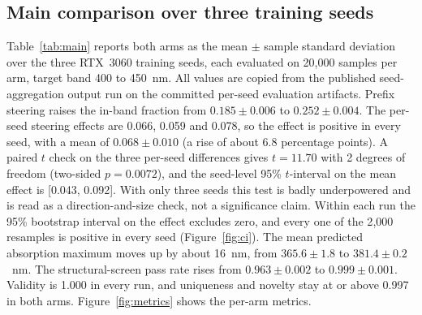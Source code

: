 \documentclass[11pt]{article}
\begin{document}
\subsection{Main comparison over three training seeds}
\label{sec:seeds}

Table~\ref{tab:main} reports both arms as the mean $\pm$ sample standard deviation over
the three RTX~3060 training seeds, each evaluated on 20{,}000 samples per arm, target band
400 to 450~nm. All values are copied from the published seed-aggregation
output run on the committed per-seed evaluation artifacts. Prefix steering raises the in-band fraction from
$0.185 \pm 0.006$ to $0.252 \pm 0.004$. The per-seed steering effects are 0.066, 0.059 and
0.078, so the effect is positive in every seed, with a mean of $0.068 \pm 0.010$ (a rise of
about 6.8 percentage points). A paired $t$ check on the three per-seed differences gives
$t = 11.70$ with 2 degrees of freedom (two-sided $p = 0.0072$), and the seed-level 95\%
$t$-interval on the mean effect is [0.043, 0.092]. With only three seeds this test is badly
underpowered and is read as a direction-and-size check, not a significance claim. Within
each run the 95\% bootstrap interval on the effect excludes zero, and every one of the
2{,}000 resamples is positive in every seed (Figure~\ref{fig:ci}). The mean predicted
absorption maximum moves up by about 16~nm, from $365.6 \pm 1.8$ to $381.4 \pm 0.2$~nm. The
structural-screen pass rate rises from $0.963 \pm 0.002$ to $0.999 \pm 0.001$. Validity is
1.000 in every run, and uniqueness and novelty stay at or above 0.997 in both arms.
Figure~\ref{fig:metrics} shows the per-arm metrics.
\end{document}
